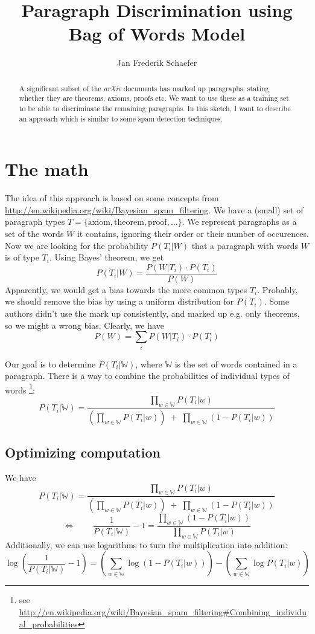 \documentclass{bluenote}
\title{Paragraph Discrimination using Bag of Words Model}
\author{Jan Frederik Schaefer}
\begin{document}
\maketitle

\begin{abstract}
A significant subset of the \emph{arXiv} documents has marked up paragraphs,
stating whether they are theorems, axioms, proofs etc.
We want to use these as a training set to be able to discriminate the remaining paragraphs.
In this sketch, I want to describe an approach which is similar to some spam detection techniques.
\end{abstract}

\section{The math}
The idea of this approach is based on some concepts from \url{http://en.wikipedia.org/wiki/Bayesian_spam_filtering}.
We have a (small) set of paragraph types $T = \{\text{axiom}, \text{theorem}, \text{proof}, \ldots\}$.
We represent paragraphs as a set of the words $W$ it contains, ignoring their order or their number of occurences.
Now we are looking for the probability $P(T_i|W)$ that a paragraph with words $W$ is of type $T_i$.
Using Bayes' theorem, we get
$$P(T_i|W) = \frac{P(W|T_i)\cdot P(T_i)}{P(W)}$$
Apparently, we would get a bias towards the more common types $T_i$.
Probably, we should remove the bias by using a uniform distribution for $P(T_i)$.
Some authors didn't use the mark up consistently, and marked up e.g. only theorems,
so we might a wrong bias. Clearly, we have
$$P(W) = \sum_iP(W|T_i)\cdot P(T_i)$$

Our goal is to determine $P(T_i|\mathbb{W})$, where $\mathbb{W}$ is the set of words contained in a paragraph.
There is a way to combine the probabilities of individual types of words
\footnote{see \url{http://en.wikipedia.org/wiki/Bayesian_spam_filtering\#Combining_individual_probabilities}}:
$$P(T_i|\mathbb{W}) = \frac{\prod_{w\in \mathbb{W}}P(T_i|w)}{\left(\prod_{w\in \mathbb{W}}P(T_i|w)\right)
\;+\; \prod_{w\in \mathbb{W}}\left(1-P(T_i|w)\right)}$$

\newpage

\subsection{Optimizing computation}
We have 
$$P(T_i|\mathbb{W}) = \frac{\prod_{w\in \mathbb{W}}P(T_i|w)}{\left(\prod_{w\in \mathbb{W}}P(T_i|w)\right)
\;+\; \prod_{w\in \mathbb{W}}\left(1-P(T_i|w)\right)}$$
$$\Leftrightarrow\quad\quad \frac{1}{P(T_i|\mathbb{W})}-1
= \frac{\prod_{w\in \mathbb{W}}\left(1-P(T_i|w)\right)}{\prod_{w\in \mathbb{W}}P(T_i|w)}$$
Additionally, we can use logarithms to turn the multiplication into addition:
$$\log\left(\frac{1}{P(T_i|\mathbb{W})}-1\right)
= \left(\sum_{w\in \mathbb{W}}\log\left(1-P(T_i|w)\right)\right)
-\left(\sum_{w\in \mathbb{W}}\log P(T_i|w)\right)$$
\end{document}

